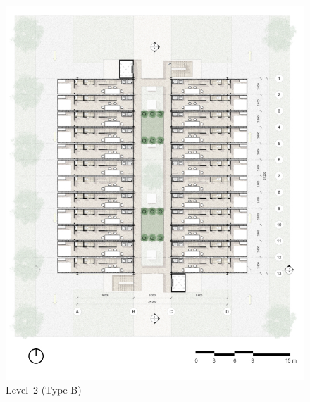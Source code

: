﻿%
\begin{figure}[H]
	\centering
	\includegraphics[width=\linewidth]{src/graphics/container-village--level-02.jpg}
	\caption*{%
		Level~2 (Type B)
	}
	\label{
		fig:container-village--level-02
	}
\end{figure}
